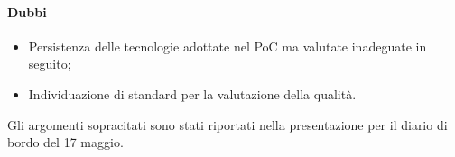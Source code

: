 \paragraph{Dubbi}
\begin{itemize}
	\item Persistenza delle tecnologie adottate nel PoC ma valutate inadeguate in seguito;
	\item Individuazione di standard per la valutazione della qualità.
\end{itemize}

\vspace{0.5\baselineskip}
\par Gli argomenti sopracitati sono stati riportati nella presentazione per il diario di bordo del 17 maggio.

